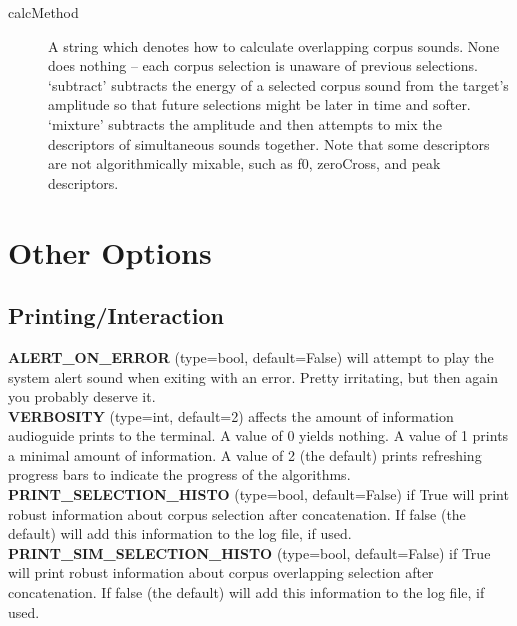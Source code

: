 \documentclass{article}
\newcommand{\optEntry}[4]{\textbf{#1} (type=#2, default=#3) #4\hspace{0.5em}\\}
\begin{document}
\begin{spacing}{1.2}
\begin{description}

\item[calcMethod] A string which denotes how to calculate overlapping corpus sounds.  None does nothing -- each corpus selection is unaware of previous selections.  `subtract' subtracts the energy of a selected corpus sound from the target's amplitude so that future selections might be later in time and softer.  `mixture' subtracts the amplitude and then attempts to mix the descriptors of simultaneous sounds together.  Note that some descriptors are not algorithmically mixable, such as f0, zeroCross, and peak descriptors.
\end{description}

\section{Other Options}

\subsection{Printing/Interaction}
\optEntry{ALERT\_ON\_ERROR}{bool}{False}{will attempt to play the system alert sound when exiting with an error.  Pretty irritating, but then again you probably deserve it.}

\optEntry{VERBOSITY}{int}{2}{affects the amount of information audioguide prints to the terminal.  A value of 0 yields nothing.  A value of 1 prints a minimal amount of information.  A value of 2 (the default) prints refreshing progress bars to indicate the progress of the algorithms.}

\optEntry{PRINT\_SELECTION\_HISTO}{bool}{False}{if True will print robust information about corpus selection after concatenation.  If false (the default) will add this information to the log file, if used.}

\optEntry{PRINT\_SIM\_SELECTION\_HISTO}{bool}{False}{if True will print robust information about corpus overlapping selection after concatenation.  If false (the default) will add this information to the log file, if used.}


\end{spacing}
\end{document}
